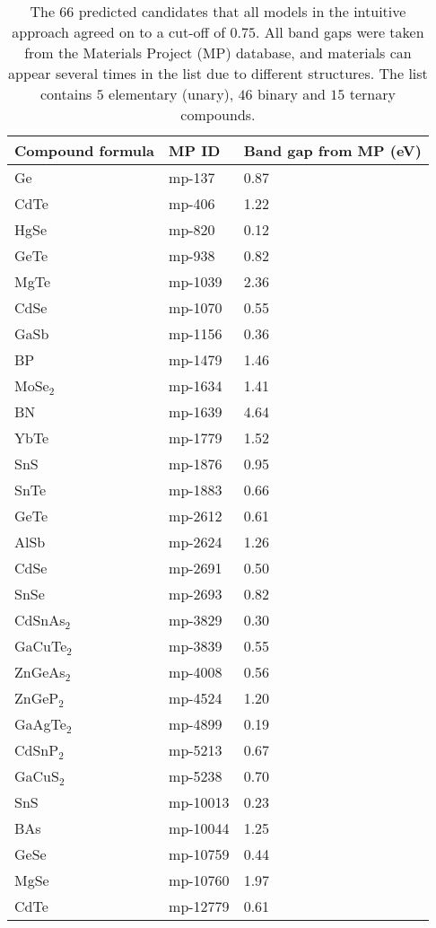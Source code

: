 \begin{center}
\begin{longtable}{M{3.5cm} M{6.5cm} M{2.0cm}}
\caption{The $66$ predicted candidates that all models in the intuitive approach agreed on to a cut-off of $0.75$. All band gaps were taken from the Materials Project (MP) database, and materials can appear several times in the list due to different structures. The list contains $5$ elementary (unary), $46$ binary and $15$ ternary compounds.}
\label{tab:03-probability-candidates}  
\\ \hline
Compound formula & MP ID & Band gap from MP (eV) \\
\hline
  Ge & mp-137 & 0.87\\
  CdTe & mp-406 & 1.22\\
  HgSe & mp-820 & 0.12\\
  GeTe & mp-938 & 0.82\\
  MgTe & mp-1039 & 2.36\\
  CdSe & mp-1070 & 0.55\\
  GaSb & mp-1156 & 0.36\\
  BP & mp-1479 & 1.46\\
  MoSe$_2$ & mp-1634 & 1.41\\
  BN & mp-1639 & 4.64\\
  YbTe & mp-1779 & 1.52\\
  SnS & mp-1876 & 0.95\\
  SnTe & mp-1883 & 0.66\\
  GeTe & mp-2612 & 0.61\\
  AlSb & mp-2624 & 1.26\\
  CdSe & mp-2691 & 0.50\\
  SnSe & mp-2693 & 0.82\\
  CdSnAs$_2$ & mp-3829 & 0.30\\
  GaCuTe$_2$ & mp-3839 & 0.55\\
  ZnGeAs$_2$ & mp-4008 & 0.56\\
  ZnGeP$_2$ & mp-4524 & 1.20\\
  GaAgTe$_2$ & mp-4899 & 0.19\\
  CdSnP$_2$ & mp-5213 & 0.67\\
  GaCuS$_2$ & mp-5238 & 0.70\\
  SnS & mp-10013 & 0.23\\
  BAs & mp-10044 & 1.25\\
  GeSe & mp-10759 & 0.44\\
  MgSe & mp-10760 & 1.97\\
  CdTe & mp-12779 & 0.61\\

\end{longtable}
\end{center}
